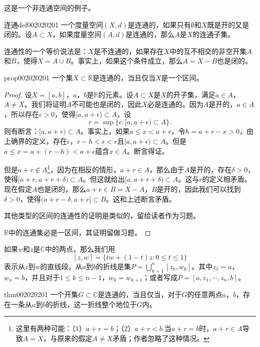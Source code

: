 这是一个非连通空间的例子。

\begin{definition}{连通}{def002020201}
一个度量空间$(X, d)$是连通的，如果只有$\emptyset$和$X$既是开的又是闭的。设$A \subset X$，如果度量空间$(A, d)$是连通的，那么$A$是$X$的连通子集。
\end{definition}

连通性的一个等价说法是：$X$是不连通的，如果存在$X$中的互不相交的非空开集$A$和$B$，使得$X = A \cup B$。事实上，如果这个条件成立，那么$A = X-B$也是闭的。

\begin{proposition}{}{prop002020201}
一个集$X \subset \mathbb{R}$是连通的，当且仅当$X$是一个区间。
\end{proposition}

\begin{proof}
设$X = [a, b]$，$a$，$b$是$\mathbb{R}$的元素。设$A \subset X$是$X$的开子集，满足$a \in A$，$A \neq X$。我们将证明$A$不可能也是闭的，因此$X$必是连通的。因为$A$是开的，$a \in A$，所以存在$\epsilon > 0$，使得$[a, a+\epsilon) \subset A$，设
\[
r = \sup\{\epsilon: [a, a+\epsilon) \subset A\}.
\]
则有断言：$[a, a+r) \subset A$。事实上，如果$a \le x < a+r$，令$h = a + r -x > 0$，由上确界的定义，存在$\epsilon$，$r - h < \epsilon < r$且$[a, a+\epsilon) \subset A$。但是$a \le x = a + (r-h) < a + \epsilon$蕴含$x \in A$。断言得证。

但是$a + r \not\in A$\footnote{这里有两种可能：（1）$a+r=b$；（2）$a+r < b$.当$a+r=b$时，$a + r \in A$导致$A=X$，与原来的假定$A \neq X$矛盾；作者忽略了这种情况。}，因为在相反的情形，$a + r \in A$，那么由于$A$是开的，存在$\delta > 0$，使得$[a + r, a+r+\delta) \subset A$。但这就给出$[a, a+r+\delta) \subset A$。这与$r$的定义相矛盾。现在假定$A$也是闭的，那么$a + r \in B = X- A$，$B$是开的，因此我们可以找到$\delta > 0$，使得$(a+r-\delta, a+r] \subset B$。这和上述断言矛盾。

其他类型的区间的连通性的证明是类似的，留给读者作为习题。

$\mathbb{R}$中的连通集必是一区间，其证明留做习题。
\end{proof}

如果$w$和$z$是$\mathbb{C}$中的两点，那么我们用
\[
[z, w] = \{tw + (1-t)z:0 \le t \le 1\}
\]
表示从$z$到$w$的直线段，从$a$到$b$的折线是集$P = \bigcup_{k=1}^{n}{[z_k, w_k]}$。其中$z_1 = a$，$w_n = b$，并且对于$1 \le k \le n-1$，$w_k = w_{k+1}$；或者写成$P=[a,z_1,\cdots, z_n, b]$。

\begin{theorem}{}{thm002020201}
一个开集$G \subset \mathbb{C}$是连通的，当且仅当，对于$G$的任意两点$a$，$b$，存在一条从$a$到$b$的折线，这一折线整个地位于$G$内。
\end{theorem}


